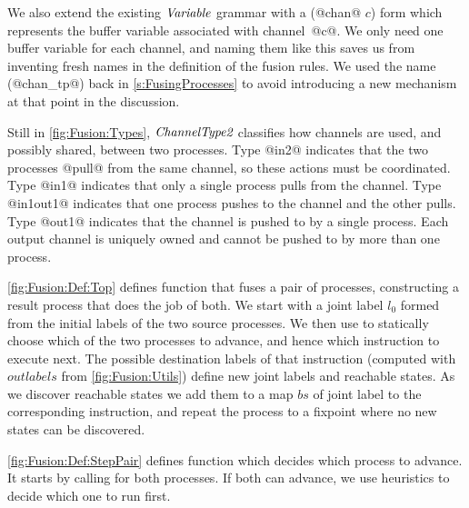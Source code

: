 
We also extend the existing $\textit{Variable}$ grammar with a (@chan@ $c$) form which represents the buffer variable associated with \mbox{channel @c@}. We only need one buffer variable for each channel, and naming them like this saves us from inventing fresh names in the definition of the fusion rules.
We used the name (@chan_tp@) back in \autoref{s:FusingProcesses} to avoid introducing a new mechanism at that point in the discussion.

Still in \autoref{fig:Fusion:Types}, $\textit{ChannelType2}$ classifies how channels are used, and possibly shared, between two processes. Type @in2@ indicates that the two processes @pull@ from the same channel, so these actions must be coordinated. Type @in1@ indicates that only a single process pulls from the channel. Type @in1out1@ indicates that one process pushes to the channel and the other pulls. Type @out1@ indicates that the channel is pushed to by a single process. Each output channel is uniquely owned and cannot be pushed to by more than one process.





\smallskip
\autoref{fig:Fusion:Def:Top} defines function  that fuses a pair of processes, constructing a result process that does the job of both. We start with a joint label $l_0$ formed from the initial labels of the two source processes. We then use  to statically choose which of the two processes to advance, and hence which instruction to execute next. The possible destination labels of that instruction (computed with $outlabels$ from \autoref{fig:Fusion:Utils}) define new joint labels and reachable states. As we discover reachable states we add them to a map $bs$ of joint label to the corresponding instruction, and repeat the process to a fixpoint where no new states can be discovered.



\autoref{fig:Fusion:Def:StepPair} defines function  which decides which process to advance. It starts by calling  for both processes. If both can advance, we use heuristics to decide which one to run first.

